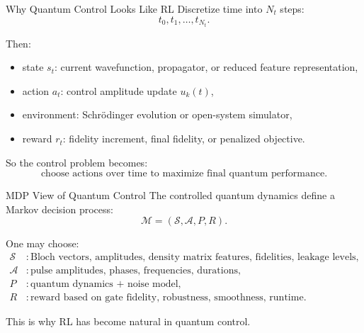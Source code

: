 \documentclass[aspectratio=169]{beamer}
\begin{document}
\begin{frame}{Why Quantum Control Looks Like RL}
Discretize time into \(N_t\) steps:
\[
t_0,t_1,\dots,t_{N_t}.
\]

Then:
\begin{itemize}
    \item state \(s_t\): current wavefunction, propagator, or reduced feature representation,
    \item action \(a_t\): control amplitude update \(u_k(t)\),
    \item environment: Schr\"odinger evolution or open-system simulator,
    \item reward \(r_t\): fidelity increment, final fidelity, or penalized objective.
\end{itemize}

So the control problem becomes:
\[
\text{choose actions over time to maximize final quantum performance.}
\]
\end{frame}

\begin{frame}{MDP View of Quantum Control}
The controlled quantum dynamics define a Markov decision process:
\[
\mathcal{M}=(\mathcal{S},\mathcal{A},P,R).
\]

One may choose:
\begin{align*}
\mathcal{S} &: \text{Bloch vectors, amplitudes, density matrix features, fidelities, leakage levels},\\
\mathcal{A} &: \text{pulse amplitudes, phases, frequencies, durations},\\
P &: \text{quantum dynamics + noise model},\\
R &: \text{reward based on gate fidelity, robustness, smoothness, runtime}.
\end{align*}

This is why RL has become natural in quantum control.
\end{frame}
\end{document}

